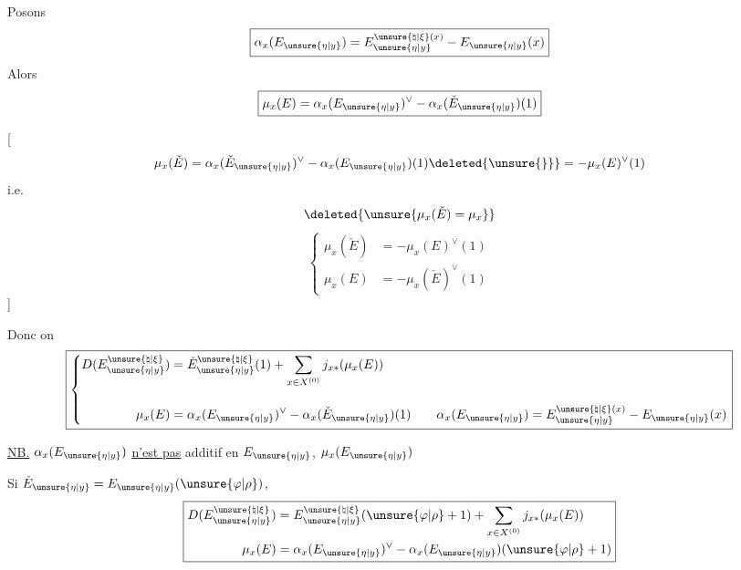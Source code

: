 Posons
\[
\boxed{\alpha_x(E_{\unsure{\eta|y}})=E_{\unsure{\eta|y}}^{\unsure{\natural|\xi}(x)}-E_{\unsure{\eta|y}}(x)}
\]
Alors
\[
\boxed{\mu_x(E)=\alpha_x(E_{\unsure{\eta|y}})^\vee-\alpha_x(\check E_{\unsure{\eta|y}})(1)}
\]

[
\[
\mu_x(\check E)=\alpha_x(\check E_{\unsure{\eta|y}})^\vee-\alpha_x(E_{\unsure{\eta|y}})(1)\deleted{\unsure{\}}}=-\mu_x(E)^\vee(1)
\]
i.e.
\[
\deleted{\unsure{\mu_x(\check E)=\mu_x}}
\]
\[
\left\{\begin{aligned}
\mu_x(\check E)&=-\mu_x(E)^\vee(1)\\
\mu_x(E)&=-\mu_x(\check E)^\vee(1)
\end{aligned}\right.
\]
]

Donc on 
\[
\boxed{\left\{\begin{aligned}
D(E_{\unsure{\eta|y}}^{\unsure{\natural|\xi}})&=\check E_{\unsure{\eta|y}}^{\unsure{\natural|\xi}}(1)+\sum_{x\in X^{(0)}}j_{x*}(\mu_x(E))\\[1em]
\mu_x(E)&=\alpha_x(E_{\unsure{\eta|y}})^\vee-\alpha_x(\check E_{\unsure{\eta|y}})(1)\qquad
\alpha_x(E_{\unsure{\eta|y}})=E_{\unsure{\eta|y}}^{\unsure{\natural|\xi}(x)}-E_{\unsure{\eta|y}}(x)
\end{aligned}\right.}
\]

\uline{NB.} $\alpha_x(E_{\unsure{\eta|y}})$ \uline{n'est pas} additif en $E_{\unsure{\eta|y}}$,  $\mu_x(E_{\unsure{\eta|y}})$ 

Si $\check E_{\unsure{\eta|y}}=E_{\unsure{\eta|y}}(\unsure{\varphi|\rho})$, 
\[
\boxed{\begin{aligned}
D(E_{\unsure{\eta|y}}^{\unsure{\natural|\xi}})&=E_{\unsure{\eta|y}}^{\unsure{\natural|\xi}}(\unsure{\varphi|\rho}+1)+\sum_{x\in X^{(0)}}j_{x*}(\mu_x(E))\\
\mu_x(E)&=\alpha_x(E_{\unsure{\eta|y}})^\vee-\alpha_x(E_{\unsure{\eta|y}})(\unsure{\varphi|\rho}+1)
\end{aligned}}
\]

